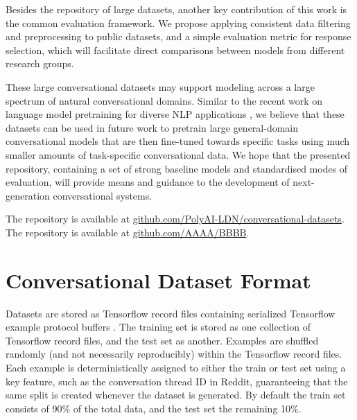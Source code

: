 \documentclass[11pt,a4paper,table]{article}
\begin{document}
Besides the repository of large datasets, another key contribution of this work is the common evaluation framework. We propose applying consistent data filtering and preprocessing to public datasets, and a simple evaluation metric for response selection, which will facilitate direct comparisons between models from different research groups.

These large conversational datasets may support modeling across a large spectrum of natural conversational domains. Similar to the recent work on language model pretraining for diverse NLP applications \cite{Howard:2018acl,Devlin:2018arxiv,Lample:2019arxiv}, we believe that these datasets can be used in future work to pretrain large general-domain conversational models that are then fine-tuned towards specific tasks using much smaller amounts of task-specific conversational data. We hope that the presented repository, containing a set of strong baseline models and standardised modes of evaluation, will provide means and guidance to the development of next-generation conversational systems.

\ifaclfinal
The repository is available at {
    \ttfamily \small \href{https://github.com/PolyAI-LDN/conversational-datasets}{github.com/{\allowbreak}PolyAI-LDN/conversational-datasets}.
}
\else
The repository is available at {
    \ttfamily \small \href{https://github.com/AAAA/BBBB}{github.com/{\allowbreak}AAAA/BBBB}.
}
\fi \label{s:introduction}



\section{Conversational Dataset Format}

Datasets are stored as Tensorflow record files containing serialized Tensorflow example protocol buffers \cite{tensorflow2015-whitepaper}. The training set is stored as one collection of Tensorflow record files, and the test set as another. Examples are shuffled randomly (and not necessarily reproducibly) within the Tensorflow record files. Each example is deterministically assigned to either the train or test set using a key feature, such as the conversation thread ID in Reddit, guaranteeing that the same split is created whenever the dataset is generated. By default the train set consists of 90\% of the total data, and the test set the remaining 10\%.
\end{document}
